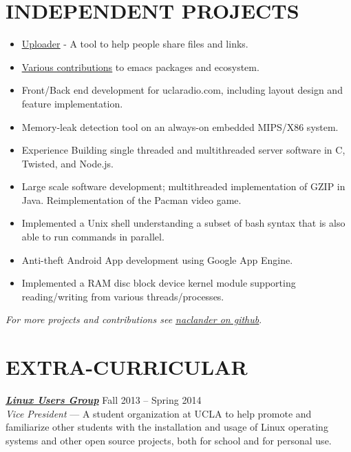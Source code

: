 \documentclass[line,letterpaper]{resume}
\begin{document}
\begin{resume}
    \section{\uppercase{Independent Projects}}
	\begin{itemize}
	\item \underline{\href{https://github.com/naclander/uploader}{Uploader}} -
	A tool to help people share files and links.
        \item
        \underline{\href{https://tinyurl.com/la495b3}{Various contributions}}
        to emacs packages and ecosystem.
	\item Front/Back end development for uclaradio.com, including layout design
	      and feature implementation.
	\item Memory-leak detection tool on an always-on embedded MIPS/X86 system.
	\item Experience Building single threaded and multithreaded server software
	      in C, Twisted, and Node.js.
	\item Large scale software development; multithreaded implementation of GZIP
	      in Java. Reimplementation of the Pacman video game.
	\item Implemented a Unix shell understanding a subset of bash syntax
	that is also able to run commands in parallel.
	\item Anti-theft Android App development using Google App Engine.
	\item Implemented a RAM disc block device kernel module supporting
	reading/writing from various threads/processes.
	\end{itemize}
    \vspace{-6pt}

    \hfill \emph{For more projects and contributions see
    \underline{\href{https://github.com/naclander}{naclander on github}}}.

    \vspace{-15pt}

\section{\uppercase{Extra-Curricular}}
    {\sl\textbf{\href{http://linux.ucla.edu}{Linux Users Group}}} \hfill Fall 2013 -- Spring 2014\\
    \emph{Vice President} --- A student organization at UCLA to help promote
	and familiarize other students with the installation and usage of Linux
	operating systems and other open source projects, both for school and for personal use.


   \end{resume}
\end{document}
